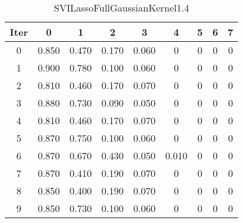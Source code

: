 \begin{table}
	\begin{center}
		\begin{tabular}{|c|c|c|c|c|c|c|c|c|}
			\hline
			Iter & 0 & 1 & 2 & 3 & 4 & 5 & 6 & 7 \\
			\hline
			0 & 0.850 & 0.470 & 0.170 & 0.060 & 0 & 0 & 0 & 0 \\
			\hline
			1 & 0.900 & 0.780 & 0.100 & 0.060 & 0 & 0 & 0 & 0 \\
			\hline
			2 & 0.810 & 0.460 & 0.170 & 0.070 & 0 & 0 & 0 & 0 \\
			\hline
			3 & 0.880 & 0.730 & 0.090 & 0.050 & 0 & 0 & 0 & 0 \\
			\hline
			4 & 0.810 & 0.460 & 0.170 & 0.070 & 0 & 0 & 0 & 0 \\
			\hline
			5 & 0.870 & 0.750 & 0.100 & 0.060 & 0 & 0 & 0 & 0 \\
			\hline
			6 & 0.870 & 0.670 & 0.430 & 0.050 & 0.010 & 0 & 0 & 0 \\
			\hline
			7 & 0.870 & 0.410 & 0.190 & 0.070 & 0 & 0 & 0 & 0 \\
			\hline
			8 & 0.850 & 0.400 & 0.190 & 0.070 & 0 & 0 & 0 & 0 \\
			\hline
			9 & 0.850 & 0.730 & 0.100 & 0.060 & 0 & 0 & 0 & 0 \\
			\hline
		\end{tabular}
	\end{center}
	\caption{SVILassoFullGaussianKernel1.4}
\end{table}